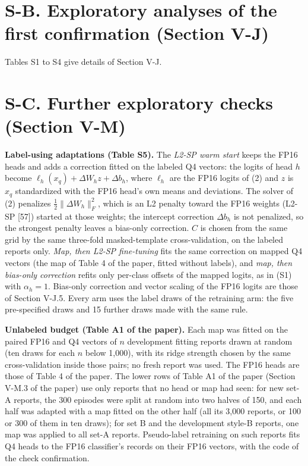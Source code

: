 \documentclass[10pt]{article}
\begin{document}
\section*{S-B. Exploratory analyses of the first confirmation (Section V-J)}

Tables S1 to S4 give details of Section V-J.

\section*{S-C. Further exploratory checks (Section V-M)}

\textbf{Label-using adaptations (Table S5).} The \textit{L2-SP warm start} keeps the FP16 heads and adds a correction fitted on the labeled Q4 vectors: the logits of head \(h\) become \(\ell_h(x_q) + \Delta W_h z + \Delta b_h\), where \(\ell_h\) are the FP16 logits of (2) and \(z\) is \(x_q\) standardized with the FP16 head's own means and deviations. The solver of (2) penalizes \(\frac{1}{2}\lVert \Delta W_h \rVert_F^2\), which is an L2 penalty toward the FP16 weights (L2-SP [57]) started at those weights; the intercept correction \(\Delta b_h\) is not penalized, so the strongest penalty leaves a bias-only correction. \(C\) is chosen from the same grid by the same three-fold masked-template cross-validation, on the labeled reports only. \textit{Map, then L2-SP fine-tuning} fits the same correction on mapped Q4 vectors (the map of Table 4 of the paper, fitted without labels), and \textit{map, then bias-only correction} refits only per-class offsets of the mapped logits, as in (S1) with \(\alpha_h = 1\). Bias-only correction and vector scaling of the FP16 logits are those of Section V-J.5. Every arm uses the label draws of the retraining arm: the five pre-specified draws and 15 further draws made with the same rule.

\textbf{Unlabeled budget (Table A1 of the paper).} Each map was fitted on the paired FP16 and Q4 vectors of \(n\) development fitting reports drawn at random (ten draws for each \(n\) below 1,000), with its ridge strength chosen by the same cross-validation inside those pairs; no fresh report was used. The FP16 heads are those of Table 4 of the paper. The lower rows of Table A1 of the paper (Section V-M.3 of the paper) use only reports that no head or map had seen: for new set-A reports, the 300 episodes were split at random into two halves of 150, and each half was adapted with a map fitted on the other half (all its 3,000 reports, or 100 or 300 of them in ten draws); for set B and the development style-B reports, one map was applied to all set-A reports. Pseudo-label retraining on such reports fits Q4 heads to the FP16 classifier's records on their FP16 vectors, with the code of the check confirmation.
\end{document}
